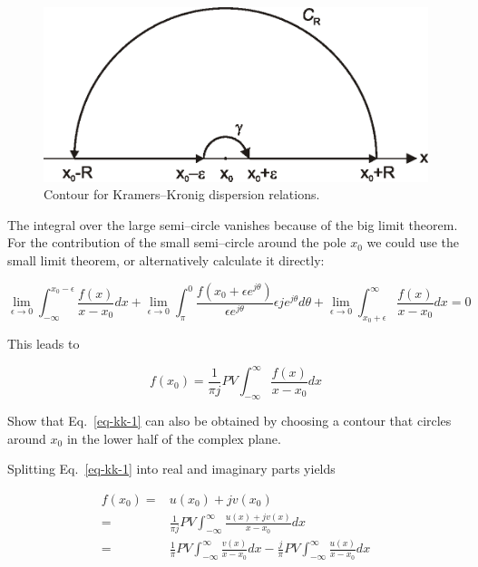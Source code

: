 \begin{figure}
\centering
\includegraphics{complex/figures/kk}
\caption{Contour for Kramers--Kronig dispersion relations.}
\label{fig-KK}
\end{figure}

The integral over the large semi--circle vanishes because of the big limit
theorem. For the contribution of the small semi--circle around the pole $x_0$ we
could use the small limit theorem, or alternatively calculate it directly:

\begin{equation}
\lim_{\epsilon \to 0} \int_{- \infty}^{x_0-\epsilon} \frac{f(x)}{x-x_0}dx +
\lim_{\epsilon \to 0} \int_{\pi}^0 \frac{f(x_0+\epsilon e^{j \theta})}{\epsilon
e^{j\theta}} \epsilon j e^{j \theta} d \theta + \lim_{\epsilon \to 0}
\int_{x_0+\epsilon}^{\infty} \frac{f(x)}{x-x_0}dx = 0
\end{equation} 

This leads to 

\begin{equation}
f(x_0) = \frac{1}{\pi j} PV \int_{- \infty}^{\infty} \frac{f(x)}{x-x_0}dx
\label{eq-kk-1}
\end{equation} 

\begin{sidebar}
\begin{ex}
Show that Eq.~\ref{eq-kk-1} can also be obtained by choosing a contour that circles around $x_0$ in the lower half of the complex plane.
\end{ex}
\end{sidebar}

Splitting Eq.~\ref{eq-kk-1} into real and imaginary parts yields

\begin{align}
f(x_0) =& u(x_0) + jv(x_0) \nonumber \\
       =& \frac{1}{\pi j} PV \int_{- \infty}^{\infty} \frac{u(x)+jv(x)}{x-x_0}dx
 \nonumber \\
       =& \frac{1}{\pi} PV \int_{- \infty}^{\infty} \frac{v(x)}{x-x_0}dx -
\frac{j}{\pi} PV \int_{- \infty}^{\infty} \frac{u(x)}{x-x_0}dx
\end{align}

